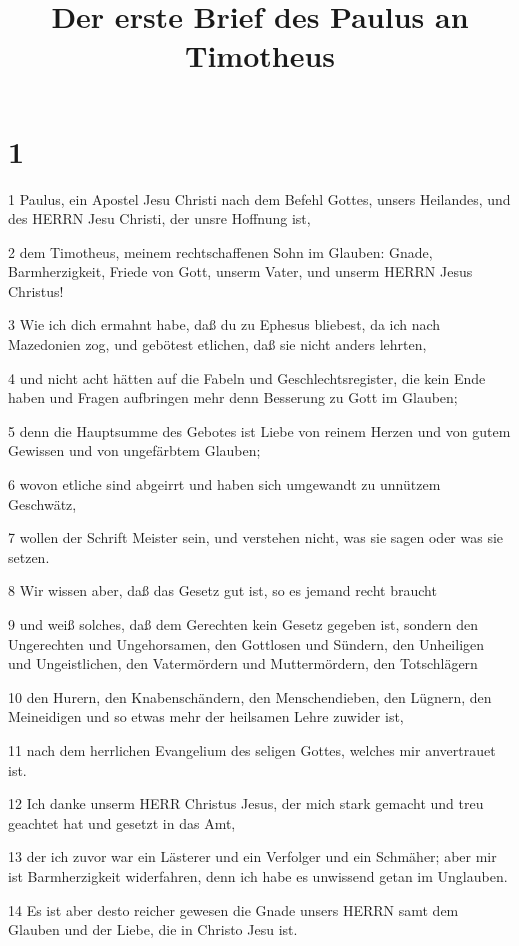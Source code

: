 

\title{Der erste Brief des Paulus an Timotheus}


\chapter{1}

\par 1 Paulus, ein Apostel Jesu Christi nach dem Befehl Gottes, unsers Heilandes, und des HERRN Jesu Christi, der unsre Hoffnung ist,
\par 2 dem Timotheus, meinem rechtschaffenen Sohn im Glauben: Gnade, Barmherzigkeit, Friede von Gott, unserm Vater, und unserm HERRN Jesus Christus!
\par 3 Wie ich dich ermahnt habe, daß du zu Ephesus bliebest, da ich nach Mazedonien zog, und gebötest etlichen, daß sie nicht anders lehrten,
\par 4 und nicht acht hätten auf die Fabeln und Geschlechtsregister, die kein Ende haben und Fragen aufbringen mehr denn Besserung zu Gott im Glauben;
\par 5 denn die Hauptsumme des Gebotes ist Liebe von reinem Herzen und von gutem Gewissen und von ungefärbtem Glauben;
\par 6 wovon etliche sind abgeirrt und haben sich umgewandt zu unnützem Geschwätz,
\par 7 wollen der Schrift Meister sein, und verstehen nicht, was sie sagen oder was sie setzen.
\par 8 Wir wissen aber, daß das Gesetz gut ist, so es jemand recht braucht
\par 9 und weiß solches, daß dem Gerechten kein Gesetz gegeben ist, sondern den Ungerechten und Ungehorsamen, den Gottlosen und Sündern, den Unheiligen und Ungeistlichen, den Vatermördern und Muttermördern, den Totschlägern
\par 10 den Hurern, den Knabenschändern, den Menschendieben, den Lügnern, den Meineidigen und so etwas mehr der heilsamen Lehre zuwider ist,
\par 11 nach dem herrlichen Evangelium des seligen Gottes, welches mir anvertrauet ist.
\par 12 Ich danke unserm HERR Christus Jesus, der mich stark gemacht und treu geachtet hat und gesetzt in das Amt,
\par 13 der ich zuvor war ein Lästerer und ein Verfolger und ein Schmäher; aber mir ist Barmherzigkeit widerfahren, denn ich habe es unwissend getan im Unglauben.
\par 14 Es ist aber desto reicher gewesen die Gnade unsers HERRN samt dem Glauben und der Liebe, die in Christo Jesu ist.

